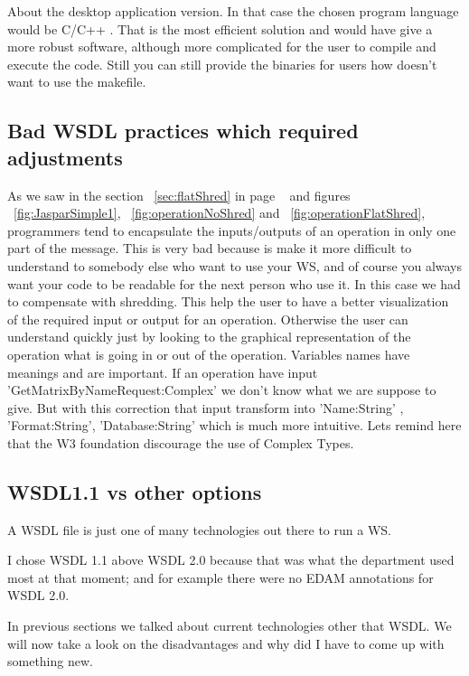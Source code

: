 \documentclass[a4paper,10pt]{article}
\begin{document}
    About the desktop application version. In that case the chosen program language would be C/C++ \cite{benchmarks01} \cite{benchmarks02}. That is the most efficient solution and would have give a more robust software, although more complicated for the user to compile and execute the code. Still you can still provide the binaries for users how doesn't want to use the makefile.

  \subsection{Bad WSDL practices which required adjustments}

  As we saw in the section ~\ref{sec:flatShred} in page ~\pageref{sec:flatShred} and figures ~\ref{fig:JasparSimple1}, ~\ref{fig:operationNoShred} and ~\ref{fig:operationFlatShred}, programmers tend to encapsulate the inputs/outputs of an operation in only one part of the message. This is very bad because is make it more difficult to understand to somebody else who want to use your WS, and of course you always want your code to be readable for the next person who use it. In this case we had to compensate with shredding. This help the user to have a better visualization of the required input or output for an operation. Otherwise the user can understand quickly just by looking to the graphical representation of the operation what is going in or out of the operation. Variables names have meanings and are important. If an operation have input 'GetMatrixByNameRequest:Complex' we don't know what we are suppose to give. But with this correction that input transform into 'Name:String' , 'Format:String', 'Database:String' which is much more intuitive. Lets remind here that the W3 foundation discourage the use of Complex Types. 

  \subsection{WSDL1.1 vs other options}

  A WSDL file is just one of many technologies out there to run a WS.\vspace{3 mm}

  I chose WSDL 1.1 above WSDL 2.0 because that was what the department used most at that moment; and for example there were no EDAM annotations for WSDL 2.0.\vspace{3 mm}

  In previous sections we talked about current technologies other that WSDL. We will now take a look on the disadvantages and why did I have to come up with something new.\vspace{3 mm}
\end{document}
